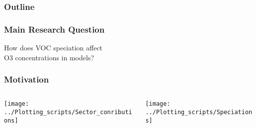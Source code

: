 \begin{frame}
    \frametitle{Outline} 
    \tableofcontents[currentsection]
\end{frame} 

\begin{frame}
    \frametitle{Main Research Question} 

    \vspace{-0.7cm}
    \begin{center}
        \LARGE{How does VOC speciation affect\\\vspace{3mm} O3 concentrations in models?}
    \end{center}
\end{frame}

\begin{frame}
    \frametitle{Motivation}
    \begin{columns}[onlytextwidth]
        \begin{column}{0.45\textwidth}
            \begin{flushleft}
                \vspace{-1.5cm}
                \texttt{[image: ../Plotting\_scripts/Sector\_conributions]} 
            \end{flushleft}
        \end{column}%
        \begin{column}{0.45\textwidth}
            \begin{flushright}
                \vspace{-1.5cm}
                \texttt{[image: ../Plotting\_scripts/Speciations]} 
            \end{flushright}
        \end{column}
    \end{columns}
\end{frame}

